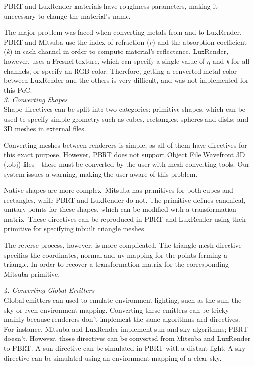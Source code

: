 PBRT and LuxRender materials have roughness parameters, making it unecessary to
change the material's name.

The major problem was faced when converting metals from and to LuxRender. PBRT 
and Mitsuba use the index of refraction ($\eta$) and the absorption 
coefficient (\textit{k}) in each channel in order to compute material's 
reflectance. LuxRender, however, uses a Fresnel texture, which can specify a 
single value of $\eta$ and \textit{k} for all channels, or specify an RGB 
color. Therefore, getting a converted metal color between LuxRender and the 
others is very difficult, and was not implemented for this PoC. \\

\textit{3. Converting Shapes} \\
Shape directives can be split into two categories: primitive shapes, which can
be used to specify simple geometry such as cubes, rectangles, spheres and disks;
and 3D meshes in external files.

Converting meshes between renderers is simple, as all of them have directives
for this exact purpose. However, PBRT does not support Object File Wavefront 3D
(.obj) files - these must be converted by the user with mesh converting tools.
Our system issues a warning, making the user aware of this problem.

Native shapes are more complex. Mitsuba has primitives for both cubes and
rectangles, while PBRT and LuxRender do not. The primitive defines canonical,
unitary points for these shapes, which can be modified with a transformation
matrix. These directives can be reproduced in PBRT and LuxRender using their
primitive for specifying inbuilt triangle meshes.

The reverse process, however, is more complicated. The triangle mesh directive
specifies the coordinates, normal and uv mapping for the points forming a
triangle. In order to recover a transformation matrix for the corresponding
Mitsuba primitive, 

\textit{4. Converting Global Emitters} \\
Global emitters can used to emulate environment lighting, such as the sun, the
sky or even environment mapping. Converting these emitters can be tricky, mainly
because renderers don't implement the same algorithms and directives. For
instance, Mitsuba and LuxRender implement sun and sky algorithms; PBRT doesn't.
However, these directives can be converted from Mitsuba and LuxRender to PBRT. A
sun directive can be simulated in PBRT with a distant light. A sky directive can
be simulated using an environment mapping of a clear sky.

